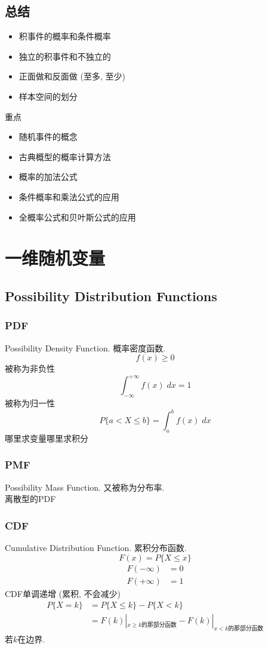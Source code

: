 \documentclass[a4paper]{report}
\begin{document}
\section{总结}
\begin{itemize}
  \item 积事件的概率和条件概率
  \item 独立的积事件和不独立的
  \item 正面做和反面做 (至多, 至少)
  \item 样本空间的划分
\end{itemize}
重点
\begin{itemize}
  \item 随机事件的概念
  \item 古典概型的概率计算方法
  \item 概率的加法公式
  \item 条件概率和乘法公式的应用
  \item 全概率公式和贝叶斯公式的应用
\end{itemize}
\chapter{一维随机变量}

\section{Possibility Distribution Functions}
\subsection{PDF}
Possibility Density Function. 概率密度函数. 
$$f(x)\geq 0$$
被称为非负性
$$\int_{-\infty}^{+\infty}f(x)\;dx=1$$
被称为归一性\\
$$P \{a<X\leq b\}=\int_a^b f(x)\;dx$$
哪里求变量哪里求积分
\subsection{PMF}
Possibility Mass Function. 又被称为分布率. \\
离散型的PDF
\subsection{CDF}
Cumulative Distribution Function. 累积分布函数. 
$$F(x)=P\{X\leq x\}$$
\begin{align*}
F(-\infty)&=0\\
F(+\infty)&=1
\end{align*}
CDF单调递增 (累积, 不会减少)\\
\begin{align*}
  P\{X=k\}&=P\{X\leq k\}-P\{X<k\}\\
  &=F(k)|_{x\geq k\text{的那部分函数}}-F(k)|_{x<k\text{的那部分函数}}
\end{align*}
若$k$在边界. 
\end{document}
